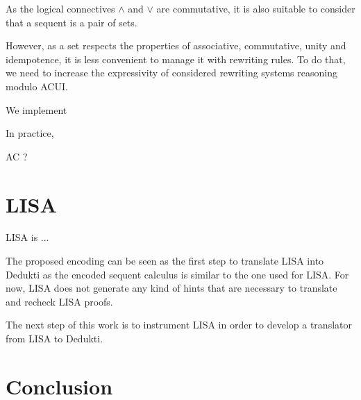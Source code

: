 \documentclass{article}
\begin{document}
	As the logical connectives $\land$ and $\lor$ are commutative, it is also suitable to consider that a sequent is a pair of sets.
	
	However, as a set respects the properties of associative, commutative, unity and idempotence, it is less convenient to manage it with rewriting rules.
	To do that, we need to increase the expressivity of considered rewriting systems reasoning modulo ACUI.
	
	We implement 
	
	In practice, 
	
	AC ?
	
	\section{LISA}
	
	LISA is ...
	
	The proposed encoding can be seen as the first step to translate LISA into Dedukti as the encoded sequent calculus is similar to the one used for LISA.
	For now, LISA does not generate any kind of hints that are necessary to translate and recheck LISA proofs.
	
	The next step of this work is to instrument LISA in order to develop a translator from LISA to Dedukti.
	
	
	
	\section{Conclusion}
	
\end{document}
